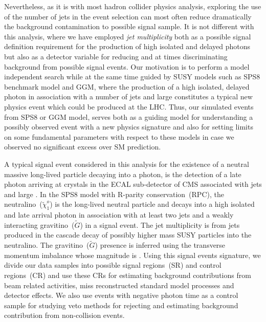 Nevertheless, as it is with most hadron collider physics analysis, exploring the use of the number of jets in the event selection can most often reduce dramatically the background contamination to possible signal sample. It is not different with this analysis, where we have employed \textit{jet multiplicity} both as a possible signal definition requirement for the production of high \pt isolated and delayed photons but also as a detector variable for reducing and at times discriminating  background from possible signal events.
Our motivation is to perform a model independent search while at the same time guided by SUSY models such as SPS8 benchmark model and GGM, where the production of a high \pt isolated, delayed photon in association  with a number of jets and large \MET constitutes a typical new physics event  which could be produced at the LHC.
Thus, our simulated events from SPS8 or GGM model, serves both as a guiding model for  understanding a possibly observed event with a new physics signature and also for setting  limits on some fundamental parameters with respect to these models in case we observed no significant excess over SM prediction.

A typical signal event considered in this analysis for the existence of a neutral massive long-lived particle decaying into a photon, is the detection of a late photon arriving at crystals in the ECAL sub-detector of CMS associated with jets and large \MET . In the SPS8 model with R-parity conservation~(RPC), the neutralino~($\tilde{\chi}^{o}_{1}$) is the long-lived neutral particle and decays into a high \pt isolated and late arrival photon in association with at least two jets and a weakly interacting gravitino~($\tilde{G}$) in a signal event. The jet multiplicity is from jets produced in the cascade decay of possibly higher mass SUSY particles into the neutralino. The gravitino~($\tilde{G}$) presence is inferred using the transverse momentum imbalance whose magnitude is \MET .
Using this signal events signature, we divide our data samples into possible signal regions~(SR) and control regions~(CR) and use these CRs for estimating background contributions  from beam related activities, miss reconstructed standard model processes and detector effects. We also use events with negative photon time as a control sample for studying veto methods for rejecting and estimating background contribution from non-collision events.
